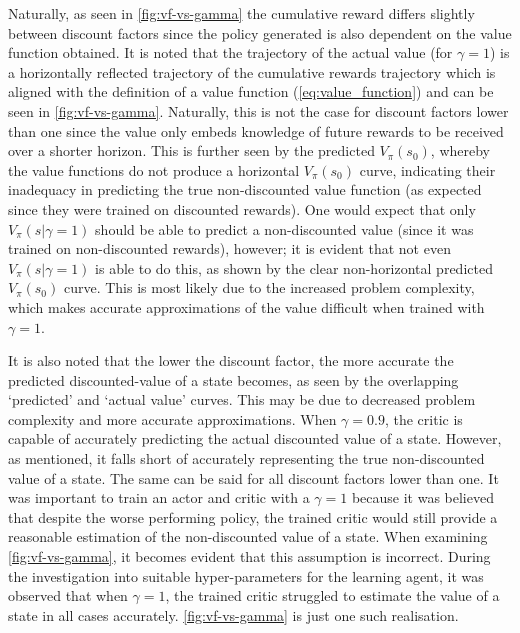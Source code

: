  Naturally, as seen in \autoref{fig:vf-vs-gamma} the cumulative reward differs slightly between discount factors since the policy generated is also dependent on the value function obtained. It is noted that the trajectory of the actual value (for $\gamma = 1$) is a horizontally reflected trajectory of the cumulative rewards trajectory which is aligned with the definition of a value function (\autoref{eq:value_function}) and can be seen in \autoref{fig:vf-vs-gamma}. Naturally, this is not the case for discount factors lower than one since the value only embeds knowledge of future rewards to be received over a shorter horizon. This is further seen by the predicted $V_{\pi}(s_0)$, whereby the value functions do not produce a horizontal $V_{\pi}(s_0)$ curve, indicating their inadequacy in predicting the true non-discounted value function (as expected since they were trained on discounted rewards). One would expect that only $V_{\pi}(s|\gamma = 1)$ should be able to predict a non-discounted value (since it was trained on non-discounted rewards), however; it is evident that not even $V_{\pi}(s|\gamma = 1)$ is able to do this, as shown by the clear non-horizontal predicted $V_{\pi}(s_0)$ curve. This is most likely due to the increased problem complexity, which makes accurate approximations of the value difficult when trained with $\gamma = 1$.
 
It is also noted that the lower the discount factor, the more accurate the predicted discounted-value of a state becomes, as seen by the overlapping ‘predicted’ and ‘actual value’ curves. This may be due to decreased problem complexity and more accurate approximations. When $\gamma = 0.9$, the critic is capable of accurately predicting the actual discounted value of a state. However, as mentioned, it falls short of accurately representing the true non-discounted value of a state. The same can be said for all discount factors lower than one. It was important to train an actor and critic with a $\gamma = 1$ because it was believed that despite the worse performing policy, the trained critic would still provide a reasonable estimation of the non-discounted value of a state. When examining \autoref{fig:vf-vs-gamma}, it becomes evident that this assumption is incorrect. During the investigation into suitable hyper-parameters for the learning agent, it was observed that when $\gamma = 1$, the trained critic struggled to estimate the value of a state in all cases accurately. \autoref{fig:vf-vs-gamma} is just one such realisation.

